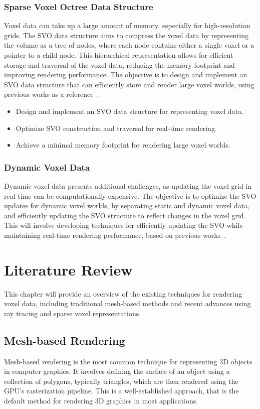 \documentclass{article}
\begin{document}
\subsubsection{Sparse Voxel Octree Data Structure}
Voxel data can take up a large amount of memory, especially for high-resolution grids. The SVO data structure aims to compress the voxel data by representing the volume as a tree of nodes, where each node contains either a single voxel or a pointer to a child node. This hierarchical representation allows for efficient storage and traversal of the voxel data, reducing the memory footprint and improving rendering performance. The objective is to design and implement an SVO data structure that can efficiently store and render large voxel worlds, using previous works as a reference~\cite{Laine_Karras_2010}.

\begin{itemize}
    \item Design and implement an SVO data structure for representing voxel data.
    \item Optimize SVO construction and traversal for real-time rendering.
    \item Achieve a minimal memory footprint for rendering large voxel worlds.
\end{itemize}

\subsubsection{Dynamic Voxel Data}
Dynamic voxel data presents additional challenges, as updating the voxel grid in real-time can be computationally expensive. The objective is to optimize the SVO updates for dynamic voxel worlds, by separating static and dynamic voxel data, and efficiently updating the SVO structure to reflect changes in the voxel grid. This will involve developing techniques for efficiently updating the SVO while maintaining real-time rendering performance, based on previous works~\cite{Crassin_2012}.

\section{Literature Review}
This chapter will provide an overview of the existing techniques for rendering voxel data, including traditional mesh-based methods and recent advances using ray tracing and sparse voxel representations.

\subsection{Mesh-based Rendering}
Mesh-based rendering is the most common technique for representing 3D objects in computer graphics. It involves defining the surface of an object using a collection of polygons, typically triangles, which are then rendered using the GPU's rasterization pipeline. This is a well-established approach, that is the default method for rendering 3D graphics in most applications.
\end{document}
